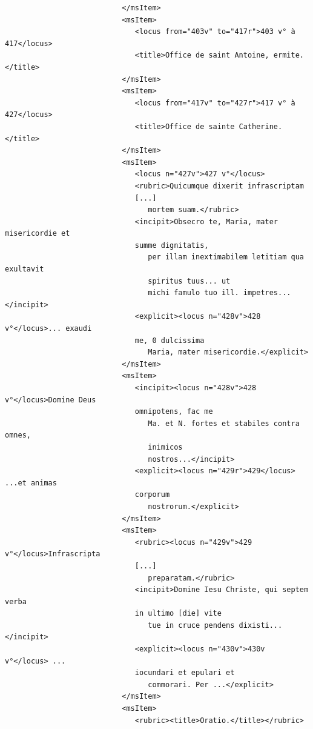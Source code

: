 \documentclass[a4paper,12pt,twoside]{book}
\begin{document}
\begin{verbatim}
                           </msItem>
                           <msItem>
                              <locus from="403v" to="417r">403 v° à 417</locus>
                              <title>Office de saint Antoine, ermite.</title>
                           </msItem>
                           <msItem>
                              <locus from="417v" to="427r">417 v° à 427</locus>
                              <title>Office de sainte Catherine.</title>
                           </msItem>
                           <msItem>
                              <locus n="427v">427 v°</locus>
                              <rubric>Quicumque dixerit infrascriptam 
                              [...]
                                 mortem suam.</rubric>
                              <incipit>Obsecro te, Maria, mater misericordie et 
                              summe dignitatis,
                                 per illam inextimabilem letitiam qua exultavit
                                 spiritus tuus... ut
                                 michi famulo tuo ill. impetres... </incipit>
                              <explicit><locus n="428v">428 v°</locus>... exaudi
                              me, 0 dulcissima
                                 Maria, mater misericordie.</explicit>
                           </msItem>
                           <msItem>
                              <incipit><locus n="428v">428 v°</locus>Domine Deus
                              omnipotens, fac me
                                 Ma. et N. fortes et stabiles contra omnes, 
                                 inimicos
                                 nostros...</incipit>
                              <explicit><locus n="429r">429</locus> ...et animas 
                              corporum
                                 nostrorum.</explicit>
                           </msItem>
                           <msItem>
                              <rubric><locus n="429v">429 v°</locus>Infrascripta
                              [...]
                                 preparatam.</rubric>
                              <incipit>Domine Iesu Christe, qui septem verba 
                              in ultimo [die] vite
                                 tue in cruce pendens dixisti... </incipit>
                              <explicit><locus n="430v">430v v°</locus> ...
                              iocundari et epulari et
                                 commorari. Per ...</explicit>
                           </msItem>
                           <msItem>
                              <rubric><title>Oratio.</title></rubric>

\end{verbatim}
\end{document}
